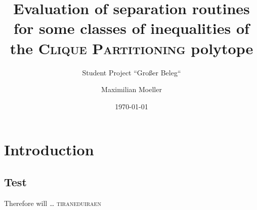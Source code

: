 \documentclass[a4paper, cdfont=false]{tudscrartcl}
\begin{document}

\title{Evaluation of separation routines for some classes of inequalities of the \textmd{\textsc{Clique Partitioning}} polytope}
\subtitle{Student Project “Großer Beleg“}
\author{Maximilian Moeller} 
\date{\today}


\maketitle[cdfont=off]

\newpage
\tableofcontents
\blinddocument

\section{Introduction}
\subsection{Test}
\blindtext
Therefore \cite{grotschelFacetsCliquePartitioning1990a} will …
\cite{andresPolyhedralStudyLifted2023a}
\textsc{tiraneduiraen}

\newpage
\printbibliography
\end{document}
